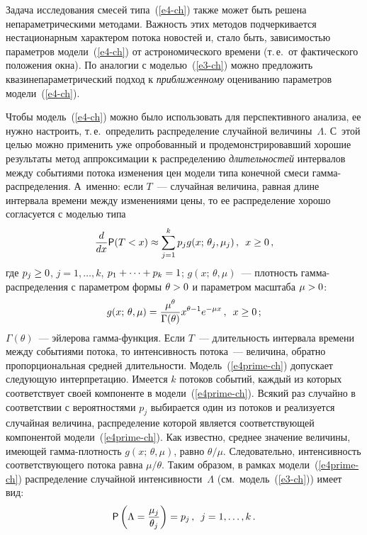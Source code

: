 \begin{multicols}{2}
Задача исследования смесей типа~(\ref{e4-ch}) также может быть решена
непараметрическими методами. Важность этих методов подчеркивается
нестационарным характером потока новостей и, стало быть,
зависимостью параметров модели~(\ref{e4-ch}) от астрономического времени (т.\,е.\ 
от фактического положения окна). По аналогии с моделью~(\ref{e3-ch}) можно
предложить квазинепараметрический подход к {\it приближенному}
оцениванию параметров модели~(\ref{e4-ch}).

Чтобы модель~(\ref{e4-ch}) можно было использовать для перспективного анализа,
ее нужно настроить, т.\,е.\ определить распределение случайной
величины~$\Lambda$. С~этой целью можно применить уже опробованный и
продемонстрировавший хорошие результаты метод аппроксимации к
распределению {\it длительностей} интервалов между событиями потока
изменения цен модели типа конечной смеси гам\-ма-рас\-пре\-де\-ле\-ния. А~именно: 
если $T$~--- случайная величина, равная длине интервала
времени между изменениями цены, то ее распределение хорошо
согласуется с моделью типа
\begin{equation}
\displaystyle\frac{\displaystyle d\mathstrut}{\displaystyle dx\mathstrut}{\sf P}(T<x)\approx\sum\limits_{j=1}^kp_j
g(x;\,\theta_j,\mu_j)\,,\enskip x\ge0\,,
\label{e4prime-ch}
\end{equation}
где $p_j\hm\ge0$, $j=1,\ldots,k$, $p_1+\cdots+p_k\hm=1$;
$g(x;\,\theta,\mu)$~--- плот\-ность гам\-ма-рас\-пре\-де\-ле\-ния с па\-ра\-мет\-ром
формы $\theta\hm>0$ и па\-ра\-мет\-ром мас\-шта\-ба $\mu\hm>0$:
$$
g(x;\,\theta,\mu)=\displaystyle\frac{\displaystyle \mu^\theta\mathstrut}{\displaystyle \Gamma(\theta)\mathstrut}x^{\theta-1}e^{-\mu
x}\,,\enskip x\ge0\,;
$$
$\Gamma(\theta)$~--- эйлерова гам\-ма-функ\-ция. Если $T$~--- длительность
интервала времени между событиями потока, то интенсивность потока~---
величина, обратно пропорциональная средней длительности. Модель~(\ref{e4prime-ch})
допускает следующую интерпретацию. Имеется $k$ потоков событий,
каждый из которых соответствует своей компоненте в модели~(\ref{e4prime-ch}).
Всякий раз случайно в соответствии с вероятностями $p_j$ выбирается
один из потоков и реализуется случайная\linebreak
 величина, распределение
которой является соответствующей компонентой модели~(\ref{e4prime-ch}). Как
известно, среднее значение величины, име\-ющей гам\-ма-плот\-ность
$g(x;\,\theta,\mu)$, равно $\theta/\mu$. Следовательно,\linebreak
интенсивность соответствующего потока равна $\mu/\theta$. Таким
образом, в рамках модели~(\ref{e4prime-ch}) распределение случайной интенсивности~$\Lambda$ 
(см.\ модель~(\ref{e3-ch})) имеет вид:
$$
{\sf P}\left(\Lambda=\displaystyle\frac{\displaystyle \mu_j\mathstrut}{\displaystyle \theta_j\mathstrut}\right)= p_j\,,\enskip
j=1,\ldots,k\,.
$$

\end{multicols}

